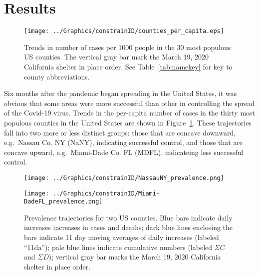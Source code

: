 \documentclass[12pt,letterpaper]{article}
\newcommand\EG{e.g.\ }
\begin{document}
\section*{Results}

\begin{figure}[h!]
\begin{center}
\texttt{[image: ../Graphics/constrainID/counties\_per\_capita.eps]}
\end{center}
\caption{\label{fig:percap}
Trends in number of cases per 1000 people in the 30 most populous US
counties.
The vertical gray bar mark the March 19, 2020 California shelter in place order.
See Table~\ref{tab:namekey} for key to county abbreviations.
}
\end{figure}


Six months after the pandemic began spreading in the United States, it
was obvious that some areas were more successful than other
in controlling the spread of the Covid-19 virus.
Trends in the per-capita number of cases in the thirty most populous 
counties in the
United States are shown in Figure~\ref{fig:percap}.
These trajectories fall into two more or less distinct groups: those
that are concave downward, \EG Nassau Co. NY (NaNY), indicating
successful control, and those that are
concave upward, \EG Miami-Dade Co. FL (MDFL), indicateing less
successful control.


\begin{figure}
{\scriptsize
\begin{center}
\texttt{[image: ../Graphics/constrainID/NassauNY\_prevalence.png]}
 
\vspace{0.25truein}

\texttt{[image: ../Graphics/constrainID/Miami-DadeFL\_prevalence.png]}
\end{center}
}
\caption{\label{fig:prev}
Prevalence trajectories for two US counties.
Blue bars indicate daily increases increases in cases and deaths;
dark blue lines enclosing the bars indicate 11 day moving averages of
daily increases (labeled ``11da'');
pale blue lines indicate cumulative numbers (labeled $\Sigma C$ and
$\Sigma D$); 
vertical gray bar marks the March 19, 2020 California shelter in place order.
}
\end{figure}
\end{document}
